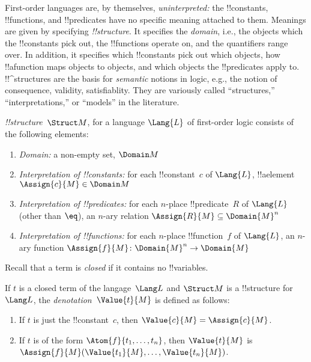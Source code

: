 \documentclass[../../include/open-logic-section]{subfiles}
\begin{document}


\begin{explain}
First-order languages are, by themselves, \emph{uninterpreted:} the
!!{constant}s, !!{function}s, and !!{predicate}s have no specific
meaning attached to them.  Meanings are given by specifying
 \emph{!!{structure}}. It specifies the
\emph{domain}, i.e., the objects which the !!{constant}s pick out, the
!!{function}s operate on, and the quantifiers range over. In addition,
it specifies which !!{constant}s pick out which objects, how
!!a{function} maps objects to objects, and which objects the
!!{predicate}s apply to.  !!^{structure}s are the basis for
\emph{semantic} notions in logic, e.g., the notion of consequence,
validity, satisfiablity. They are variously called ``structures,''
``interpretations,'' or ``models'' in the literature.
\end{explain}

\begin{defn}[!!^{structure}s]
 \emph{!!{structure}}~$\Struct M$, for a language
$\Lang{L}$ of first-order logic consists of the following elements:
\begin{enumerate}
\item \emph{Domain:} a non-empty set, $\Domain M$ 
\item \emph{Interpretation of !!{constant}s:} for each !!{constant}~$c$ of
  $\Lang{L}$, !!a{element} $\Assign{c}{M} \in \Domain M$
\item \emph{Interpretation of !!{predicate}s:} for each $n$-place
  !!{predicate}~$R$ of $\Lang{L}$ (other than $\eq$), an $n$-ary
  relation $\Assign{R}{M} \subseteq \Domain{M}^n$
\item \emph{Interpretation of !!{function}s:} for each $n$-place
  !!{function}~$f$ of $\Lang{L}$, an $n$-ary function $\Assign{f}{M}
  \colon \Domain{M}^n \to \Domain{M}$
\end{enumerate}
\end{defn}

\begin{explain}
Recall that a term is \emph{closed} if it contains no !!{variable}s.
\end{explain}

\begin{defn}
If $t$ is a closed term of the langage~$\Lang L$ and $\Struct M$ is a
!!{structure} for~$\Lang L$, the \emph{denotation}~$\Value{t}{M}$ is
defined as follows:
\begin{enumerate}
\item If $t$ is just the !!{constant}~$c$, then $\Value{c}{M} = \Assign{c}{M}$.
\item If $t$ is of the form $\Atom{f}{t_1, \ldots, t_n}$, then
  $\Value{t}{M}$ is $\Assign{f}{M}(\Value{t_1}{M}, \ldots,
  \Value{t_n}{M})$.
\end{enumerate}
\end{defn}
\end{document}

